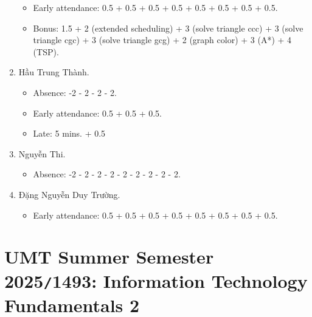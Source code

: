\documentclass{article}
\begin{document}
\begin{enumerate}
	\begin{itemize}
		\item Early attendance: 0.5 + 0.5 + 0.5 + 0.5 + 0.5 + 0.5 + 0.5 + 0.5.
		\item Bonus: 1.5 + 2 (extended scheduling) + 3 (solve triangle ccc) + 3 (solve triangle cgc) + 3 (solve triangle gcg) + 2 (graph color) + 3 (A*) + 4 (TSP).
	\end{itemize}
	\item {\sc Hầu Trung Thành.}
	\begin{itemize}
		\item Absence: -2 - 2 - 2 - 2.
		\item Early attendance: 0.5 + 0.5 + 0.5.
		\item Late: 5 mins. + 0.5
	\end{itemize}
	\item {\sc Nguyễn Thi.}
	\begin{itemize}
		\item Absence: -2 - 2 - 2 - 2 - 2 - 2 - 2 - 2 - 2.
	\end{itemize}
	\item {\sc Đặng Nguyễn Duy Trường.}
	\begin{itemize}
		\item Early attendance: 0.5 + 0.5 + 0.5 + 0.5 + 0.5 + 0.5 + 0.5 + 0.5.
	\end{itemize}
\end{enumerate}


\section{UMT Summer Semester 2025{\tt/}1493: Information Technology Fundamentals 2}
\end{document}

